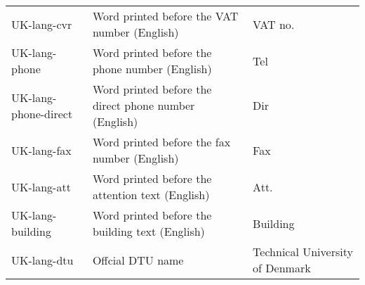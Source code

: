 \documentclass{dtuletter}
\begin{document}
\begin{longtable}{>{\ttfamily}l >{\raggedright}p{} >{\ttfamily}p{}}
UK-lang-cvr 			& Word printed before the VAT number (English) 			& VAT no.  \\
UK-lang-phone 			& Word printed before the phone number (English) 		& Tel      \\
UK-lang-phone-direct 	& Word printed before the direct phone number (English) & Dir      \\
UK-lang-fax	 			& Word printed before the fax number (English)			& Fax      \\
UK-lang-att 			& Word printed before the attention text (English)		& Att.     \\
UK-lang-building  		& Word printed before the building text (English)		& Building  \\
UK-lang-dtu				& Offcial DTU name 										& Technical University of Denmark\\
\hline
\end{longtable}
\end{document}
